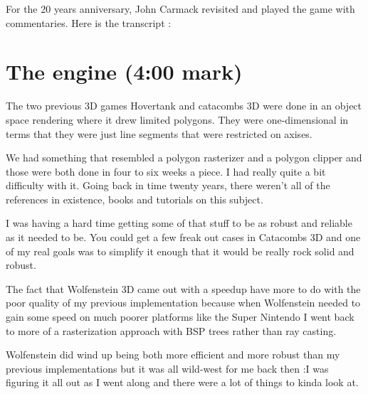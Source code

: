 \documentclass[book.tex]{subfiles}
\begin{document}
For the 20 years anniversary, John Carmack revisited and played the game with commentaries. Here is the transcript :


   
\section{The engine (4:00 mark)}

The two previous 3D games Hovertank and catacombs 3D were done in an object space rendering where it drew limited polygons. They were one-dimensional in terms that they were just line segments that were restricted on axises.\\
\par
We had something that resembled a polygon rasterizer and a polygon clipper and those were both done in four to six weeks a piece. I had really quite a bit difficulty with it. Going back in time twenty years, there weren't all of the references in existence, books and tutorials on this subject.\\
\par
I was having a hard time getting some of that stuff to be as robust
and reliable as it needed to be. You could get a few freak out cases
in Catacombs 3D and one of my real goals was to simplify it enough
that it would be really rock solid and robust.\\
\par

The fact that Wolfenstein 3D came out with a speedup have more to do with the poor quality of my previous implementation because when Wolfenstein  needed to gain some speed on much poorer platforms like the Super Nintendo I went back to more of a rasterization approach with BSP trees rather than ray casting.\\
\par

Wolfenstein did wind up being both more efficient and more robust than my previous implementations but it was all wild-west for me back then :I was figuring it  all out as I went along and there were a lot of things to kinda look at.\\
\par
\end{document}
